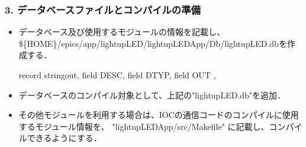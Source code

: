 \documentclass[letterpaper,10pt,dvipdfmx]{sphinxmanual}
\begin{document}
\subsubsection{3. データベースファイルとコンパイルの準備}
\label{\detokenize{epics/rst/example3__arduino_LEDcontrol01:id5}}\begin{itemize}
\item {} 
データベース及び使用するモジュールの情報を記載し、\$\{HOME\}/epics/app/lightupLED/lightupLEDApp/Db/lightupLED.dbを作成する．
\def\sphinxLiteralBlockLabel{\label{\detokenize{epics/rst/example3__arduino_LEDcontrol01:id8}}}
\begin{sphinxVerbatim}[commandchars=\\\{\},numbers=left,firstnumber=1,stepnumber=1]
record stringout,  
  field DESC,  
  field DTYP,  
  field OUT ,  
\end{sphinxVerbatim}

\item {} 
データベースのコンパイル対象として、上記の"lightupLED.db"を追加．

\begin{sphinxVerbatim}[commandchars=\\\{\}]
 

  
\end{sphinxVerbatim}

\item {} 
その他モジュールを利用する場合は、IOCの通信コードのコンパイルに使用するモジュール情報を、 "lightupLEDApp/src/Makefile" に記載し、コンパイルできるようにする．

\begin{sphinxVerbatim}[commandchars=\\\{\}]
 

   
   
   

  
  
\end{sphinxVerbatim}

\end{itemize}
\end{document}
